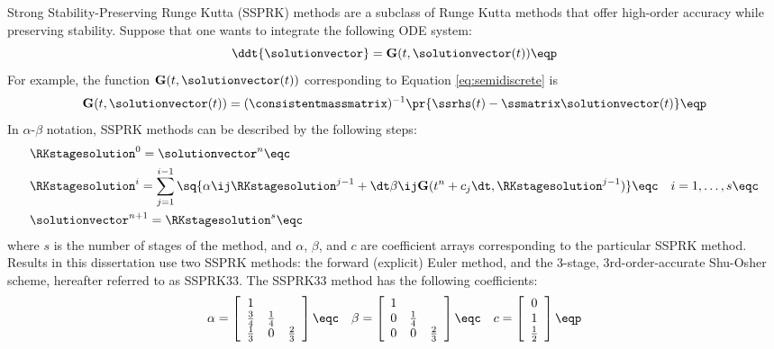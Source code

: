 Strong Stability-Preserving Runge Kutta (SSPRK) methods are a subclass of
Runge Kutta methods that offer high-order accuracy while preserving stability.
Suppose that one wants to integrate the following ODE system:
\begin{equation}
  \ddt{\solutionvector} = \mathbf{G}(t,\solutionvector(t)) \eqp
\end{equation}
For example, the function $\mathbf{G}(t,\solutionvector(t))$ corresponding
to Equation \eqref{eq:semidiscrete} is
\begin{equation}
  \mathbf{G}(t,\solutionvector(t)) = (\consistentmassmatrix)^{-1}
    \pr{\ssrhs(t) - \ssmatrix\solutionvector(t)} \eqp
\end{equation}
In $\alpha$-$\beta$ notation, SSPRK methods can be described by the following
steps:
\begin{subequations}
\begin{align}
  & \RKstagesolution^0 = \solutionvector^n \eqc \\
  & \RKstagesolution^i = \sum\limits_{j=1}^{i-1} \sq{
      \alpha\ij\RKstagesolution^{j-1}
      + \dt\beta\ij\mathbf{G}(t^n+c_j\dt, \RKstagesolution^{j-1})}
    \eqc \quad
    i = 1,\ldots,s
    \eqc \\
  & \solutionvector^{n+1} = \RKstagesolution^s \eqc
\end{align}
\end{subequations}
where $s$ is the number of stages of the method, and $\alpha$, $\beta$, and $c$
are coefficient arrays corresponding to the particular SSPRK method.
Results in this dissertation use two SSPRK methods: the forward (explicit) Euler
method, and the 3-stage, 3rd-order-accurate Shu-Osher scheme, hereafter
referred to as SSPRK33. The SSPRK33 method has the following coefficients:
\begin{equation}
  \alpha = \left[\begin{array}{c c c}
    1           &             & \\
    \frac{3}{4} & \frac{1}{4} & \\
    \frac{1}{3} & 0           & \frac{2}{3}
    \end{array}\right] \eqc \quad
  \beta = \left[\begin{array}{c c c}
    1           &             & \\
    0           & \frac{1}{4} & \\
    0           & 0           & \frac{2}{3}
    \end{array}\right] \eqc \quad
  c = \left[\begin{array}{c}
    0           \\
    1           \\
    \frac{1}{2}
    \end{array}\right] \eqp
\end{equation}

